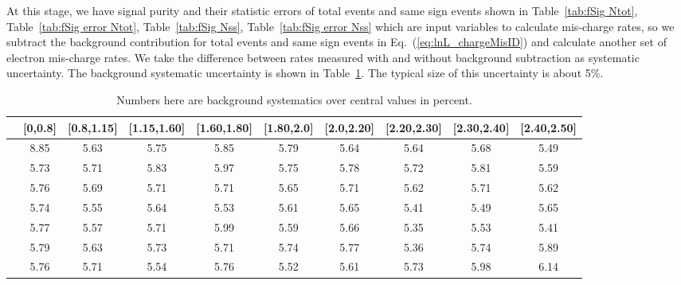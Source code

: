 At this stage, we have signal purity and their statistic errors of
total events and same sign events shown in Table~\ref{tab:fSig Ntot},
Table~\ref{tab:fSig error Ntot}, Table~\ref{tab:fSig Nss},
Table~\ref{tab:fSig error Nss} which are input variables to calculate
mis-charge rates, so we subtract the background contribution for total
events and same sign events in Eq.~(\ref{eq:lnL_chargeMisID}) and
calculate another set of electron mis-charge rates. We take the
difference between rates measured with and without background
subtraction as systematic uncertainty. The background systematic
uncertainty is shown in Table~\ref{tab:Bkg Sys}. The typical size of
this uncertainty is about 5\%.
\begin{table}
\footnotesize
\centering
\begin{tabular}{c|c|c|c|c|c|c|c|c|c}
  \hline
  \backslashbox{\pt[\GeV]}{$|$\eta$|$} &[0,0.8] &[0.8,1.15] &[1.15,1.60] &[1.60,1.80] &[1.80,2.0] &[2.0,2.20] &[2.20,2.30] &[2.30,2.40] &[2.40,2.50] \\ 
  \hline
  [15,30] &8.85 &5.63 &5.75 &5.85 &5.79 &5.64 &5.64 &5.68 &5.49 \\
  \hline
  [30,40] &5.73 &5.71 &5.83 &5.97 &5.75 &5.78 &5.72 &5.81 &5.59 \\
  \hline
  [40,50] &5.76 &5.69 &5.71 &5.71 &5.65 &5.71 &5.62 &5.71 &5.62 \\
  \hline
  [50,60] &5.74 &5.55 &5.64 &5.53 &5.61 &5.65 &5.41 &5.49 &5.65 \\
  \hline
  [60,80] &5.77 &5.57 &5.71 &5.99 &5.59 &5.66 &5.35 &5.53 &5.41 \\
  \hline
  [80,120] &5.79 &5.63 &5.73 &5.71 &5.74 &5.77 &5.36 &5.74 &5.89 \\
  \hline
  [120,1000] &5.76 &5.71 &5.54 &5.76 &5.52 &5.61 &5.73 &5.98 &6.14  \\
  \hline
\end{tabular}
\caption{Numbers here are background systematics over central values
  in percent.}
\label{tab:Bkg Sys}
\end{table} 
 



 



